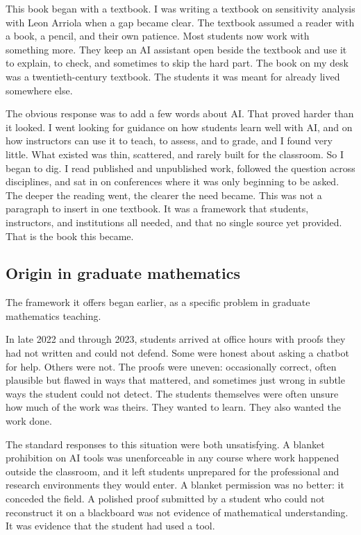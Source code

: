 \documentclass{SIAMbook2023}
\begin{document}
\begin{thepreface}
This book began with a textbook. I was writing a textbook on sensitivity analysis with Leon Arriola when a gap became clear. The textbook assumed a reader with a book, a pencil, and their own patience. Most students now work with something more. They keep an AI assistant open beside the textbook and use it to explain, to check, and sometimes to skip the hard part. The book on my desk was a twentieth-century textbook. The students it was meant for already lived somewhere else.

The obvious response was to add a few words about AI. That proved harder than it looked. I went looking for guidance on how students learn well with AI, and on how instructors can use it to teach, to assess, and to grade, and I found very little. What existed was thin, scattered, and rarely built for the classroom. So I began to dig. I read published and unpublished work, followed the question across disciplines, and sat in on conferences where it was only beginning to be asked. The deeper the reading went, the clearer the need became. This was not a paragraph to insert in one textbook. It was a framework that students, instructors, and institutions all needed, and that no single source yet provided. That is the book this became.

\subsection*{Origin in graduate mathematics}

The framework it offers began earlier, as a specific problem in graduate mathematics teaching.

In late 2022 and through 2023, students arrived at office hours with proofs they had not written and could not defend. Some were honest about asking a chatbot for help. Others were not. The proofs were uneven: occasionally correct, often plausible but flawed in ways that mattered, and sometimes just wrong in subtle ways the student could not detect. The students themselves were often unsure how much of the work was theirs. They wanted to learn. They also wanted the work done.

The standard responses to this situation were both unsatisfying. A blanket prohibition on AI tools was unenforceable in any course where work happened outside the classroom, and it left students unprepared for the professional and research environments they would enter. A blanket permission was no better: it conceded the field. A polished proof submitted by a student who could not reconstruct it on a blackboard was not evidence of mathematical understanding. It was evidence that the student had used a tool.


\end{thepreface}
\end{document}
